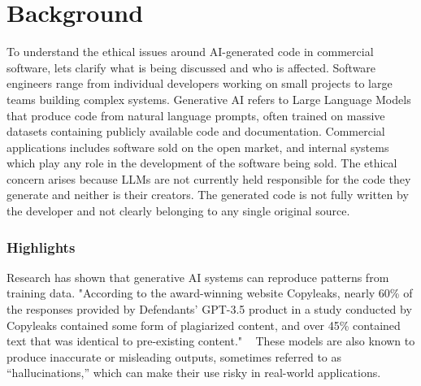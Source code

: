 \documentclass[sigconf, 12pt]{acmart}
\begin{document}
\section{Background}
To understand the ethical issues around AI-generated code in commercial software, lets clarify what is being discussed and who is affected. Software engineers range from individual developers working on small projects to large teams building complex systems. Generative AI refers to Large Language Models that produce code from natural language prompts, often trained on massive datasets containing publicly available code and documentation. Commercial applications includes software sold on the open market, and internal systems which play any role in the development of the software being sold.
The ethical concern arises because LLMs are not currently held responsible for the code they generate and neither is their creators. The generated code is not fully written by the developer and not clearly belonging to any single original source.
\subsubsection{Highlights}
Research has shown that generative AI systems can reproduce patterns from training data. "According to the award-winning website Copyleaks, nearly 60\% of the responses provided by Defendants’ GPT-3.5 product in a study conducted by Copyleaks contained some form of plagiarized content, and over 45\% contained text that was identical to pre-existing content." ~\cite{(7)} These models are also known to produce inaccurate or misleading outputs, sometimes referred to as “hallucinations,” which can make their use risky in real-world applications. ~\cite{(3)}
\end{document}
